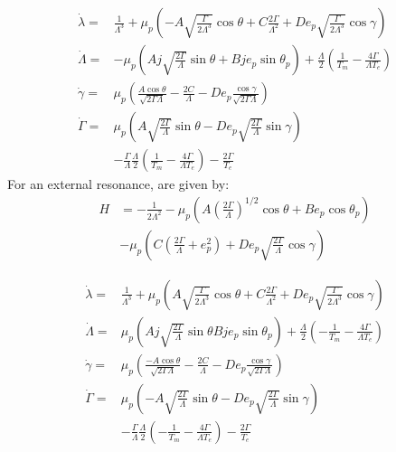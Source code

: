 \documentclass{article}
\begin{document}
\begin{align*}
\dot{\lambda}
  =& \frac{1}{\Lambda^3} + \mu_p\left(-A\sqrt{\frac{\Gamma}{2\Lambda^3}}\cos\theta
    + C\frac{2\Gamma}{\Lambda^2} + De_p\sqrt{\frac{\Gamma}{2\Lambda^3}}\cos\gamma\right) \\
\dot{\Lambda} =& -\mu_p \left(Aj\sqrt{\frac{2\Gamma}{\Lambda}}\sin\theta
      +Bj e_p\sin\theta_p\right) + \frac{\Lambda}{2}\left(\frac{1}{T_m}-\frac{4\Gamma}{\Lambda T_e}\right) \\
\dot{\gamma} =& \mu_p\left(\frac{A\cos\theta}{\sqrt{2\Gamma\Lambda}}
    - \frac{2C}{\Lambda} - De_p\frac{\cos\gamma}{\sqrt{2\Gamma\Lambda}} \right) \\
  \dot{\Gamma} = &\mu_p\left(A\sqrt{\frac{2\Gamma}{\Lambda}}\sin\theta
    - De_p\sqrt{\frac{2\Gamma}{\Lambda}}\sin \gamma\right)  \\
&-\frac{\Gamma}{\Lambda}\frac{\Lambda}{2}\left(\frac{1}{T_m}-\frac{4\Gamma}{\Lambda T_e}\right)
  -\frac{2\Gamma}{T_e}
\end{align*}
For an external resonance, are given by:
\begin{align*}
  H
  &= - \frac{1}{2\Lambda^2} - \mu_p\left(A
    \left(\frac{2\Gamma}{\Lambda}\right)^{1/2}\cos\theta + B
    e_p\cos\theta_p\right) \\
  &- \mu_p \left(C\left(\frac{2\Gamma}{\Lambda}
      + e_p^2\right) + De_p
    \sqrt{\frac{2\Gamma}{\Lambda}}\cos\gamma\right)
\end{align*}

\begin{align*}
\dot{\lambda}
  =& \frac{1}{\Lambda^3} + \mu_p\left(A\sqrt{\frac{\Gamma}{2\Lambda^3}}\cos\theta
    + C\frac{2\Gamma}{\Lambda^2} + De_p\sqrt{\frac{\Gamma}{2\Lambda^3}}\cos\gamma\right)\\
\dot{\Lambda} =& \mu_p \left(Aj\sqrt{\frac{2\Gamma}{\Lambda}}\sin\theta
      Bj e_p\sin\theta_p\right) + \frac{\Lambda}{2}\left(-\frac{1}{T_m}-\frac{4\Gamma}{\Lambda T_e}\right) \\
\dot{\gamma} =& \mu_p\left(\frac{-A\cos\theta}{\sqrt{2\Gamma\Lambda}}
    - \frac{2C}{\Lambda} - De_p\frac{\cos\gamma}{\sqrt{2\Gamma\Lambda}} \right)\\
  \dot{\Gamma} =& \mu_p\left(-A\sqrt{\frac{2\Gamma}{\Lambda}}\sin\theta
    - De_p\sqrt{\frac{2\Gamma}{\Lambda}}\sin \gamma\right) \\
&-\frac{\Gamma}{\Lambda}\frac{\Lambda}{2}\left(-\frac{1}{T_m}-\frac{4\Gamma}{\Lambda T_e}\right)
  -\frac{2\Gamma}{T_e}
\end{align*}
\end{document}
